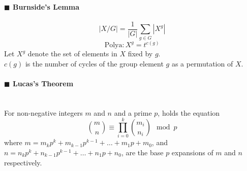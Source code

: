 \documentclass[10pt]{article}
\begin{document}
\paragraph{$\blacksquare$ Burnside's Lemma}
\noindent
\begin{displaymath}
  |X/G|=\frac{1}{|G|}\sum_{g\in G}|X^g|
\end{displaymath}
\begin{displaymath}
  \mathrm{Polya}: X^g=t^{c(g)}
\end{displaymath}
Let $X^g$ denote the set of elements in $X$ fixed by $g$. \\
$c(g)$ is the number of cycles of the group element $g$ as a permutation of $X$.
\paragraph{$\blacksquare$ Lucas's Theorem}
\noindent \\
For non-negative integers $m$ and $n$ and a prime $p$, holds the equation \\
\begin{displaymath}
  \binom{m}{n} \equiv \prod_{i=0}^k \binom{m_i}{n_i} \mod p
\end{displaymath}
where $m=m_kp^k+m_{k-1}p^{k-1}+\ldots +m_1p+m_0$, and $n=n_kp^k+n_{k-1}p^{k-1}+\ldots +n_1p+n_0$, are the base $p$ expansions of $m$ and $n$ respectively.
\end{document}
